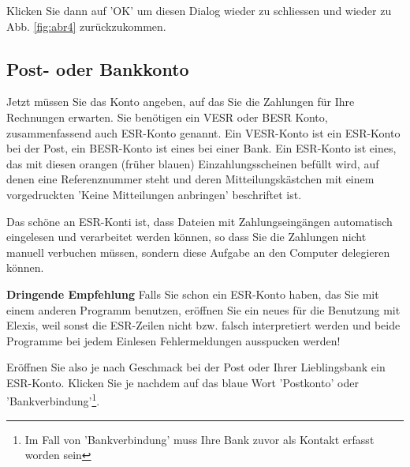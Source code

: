 \documentclass[a4paper]{scrartcl}
\begin{document}
Klicken Sie dann auf 'OK' um diesen Dialog wieder zu schliessen und wieder zu Abb. \ref{fig:abr4} zurückzukommen.


\subsection{Post- oder Bankkonto}
Jetzt müssen Sie das Konto angeben, auf das Sie die Zahlungen für Ihre Rechnungen erwarten. Sie benötigen ein VESR oder BESR Konto, zusammenfassend auch ESR-Konto genannt. Ein VESR-Konto ist ein ESR-Konto bei der Post, ein BESR-Konto ist eines bei einer Bank. Ein ESR-Konto ist eines, das mit diesen orangen (früher blauen) Einzahlungsscheinen befüllt wird, auf denen eine Referenznummer steht und deren Mitteilungskästchen mit einem vorgedruckten 'Keine Mitteilungen anbringen' beschriftet ist.

Das schöne an ESR-Konti ist, dass Dateien mit Zahlungseingängen automatisch eingelesen und verarbeitet werden können, so dass Sie die Zahlungen nicht manuell verbuchen müssen, sondern diese Aufgabe an den Computer delegieren können.

\medskip

 \textbf{Dringende Empfehlung} Falls Sie schon ein ESR-Konto haben, das Sie mit einem anderen Programm benutzen, eröffnen Sie ein neues für die Benutzung mit Elexis, weil sonst die ESR-Zeilen nicht bzw. falsch interpretiert werden und beide Programme bei jedem Einlesen Fehlermeldungen ausspucken werden!

\medskip

Eröffnen Sie also je nach Geschmack bei der Post oder Ihrer Lieblingsbank ein ESR-Konto. Klicken Sie je nachdem auf das blaue Wort 'Postkonto' oder 'Bankverbindung'\footnote{Im Fall von 'Bankverbindung' muss Ihre Bank zuvor als Kontakt erfasst worden sein}.
\end{document}
